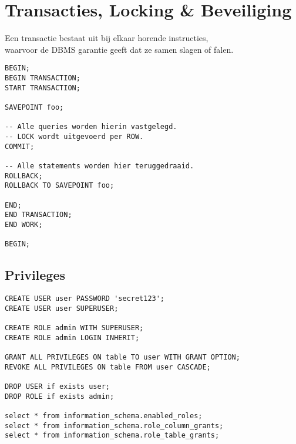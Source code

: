 \section{Transacties, Locking \& Beveiliging}

Een transactie bestaat uit bij elkaar horende instructies,\\
waarvoor de DBMS garantie geeft dat ze samen slagen of falen.

\begin{tiny}
\begin{lstlisting}
BEGIN;
BEGIN TRANSACTION;
START TRANSACTION;

SAVEPOINT foo;

-- Alle queries worden hierin vastgelegd.
-- LOCK wordt uitgevoerd per ROW.
COMMIT;

-- Alle statements worden hier teruggedraaid.
ROLLBACK;
ROLLBACK TO SAVEPOINT foo;

END;
END TRANSACTION;
END WORK;

BEGIN;
\end{lstlisting}
\end{tiny}

\subsection{Privileges}
\begin{tiny}
\begin{lstlisting}
CREATE USER user PASSWORD 'secret123';
CREATE USER user SUPERUSER;

CREATE ROLE admin WITH SUPERUSER;
CREATE ROLE admin LOGIN INHERIT;

GRANT ALL PRIVILEGES ON table TO user WITH GRANT OPTION;
REVOKE ALL PRIVILEGES ON table FROM user CASCADE;

DROP USER if exists user;
DROP ROLE if exists admin;

select * from information_schema.enabled_roles;
select * from information_schema.role_column_grants;
select * from information_schema.role_table_grants;
\end{lstlisting}
\end{tiny}